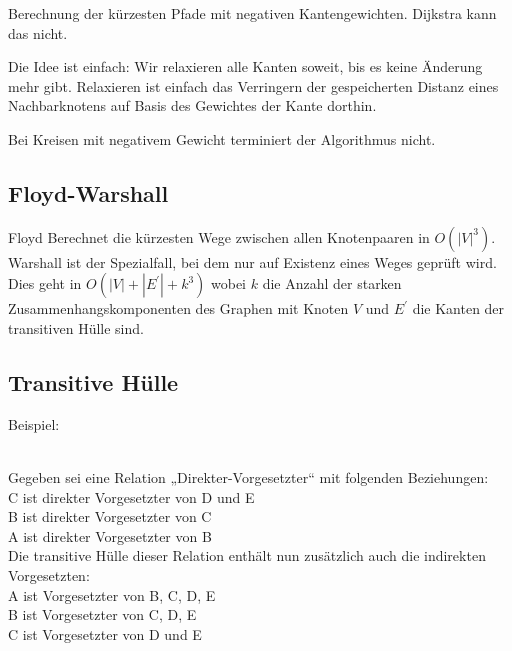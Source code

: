 \documentclass[11pt]{scrartcl}
\begin{document}
Berechnung der kürzesten Pfade mit negativen Kantengewichten. Dijkstra kann das nicht.

Die Idee ist einfach: Wir relaxieren alle Kanten soweit, bis es keine Änderung mehr gibt. Relaxieren ist einfach das Verringern der gespeicherten Distanz eines Nachbarknotens auf Basis des Gewichtes der Kante dorthin.

Bei Kreisen mit negativem Gewicht terminiert der Algorithmus nicht.

\subsection{Floyd-Warshall}

Floyd Berechnet die kürzesten Wege zwischen allen Knotenpaaren in $O(|V|^3)$. Warshall ist der Spezialfall, bei dem nur auf Existenz eines Weges geprüft wird. Dies geht in $O(|V| + |E^\prime| + k^3)$ wobei $k$ die Anzahl der starken Zusammenhangskomponenten des Graphen mit Knoten $V$ und $E^\prime$ die Kanten der transitiven Hülle sind.

\subsection{Transitive Hülle}

Beispiel: \\
\\
Gegeben sei eine Relation „Direkter-Vorgesetzter“ mit folgenden Beziehungen: \\

C ist direkter Vorgesetzter von D und E \\
B ist direkter Vorgesetzter von C \\
A ist direkter Vorgesetzter von B \\

Die transitive Hülle dieser Relation enthält nun zusätzlich auch die indirekten Vorgesetzten: \\

A ist Vorgesetzter von B, C, D, E \\
B ist Vorgesetzter von C, D, E \\
C ist Vorgesetzter von D und E \\
\end{document}
